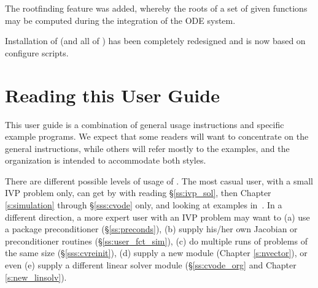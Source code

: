 The rootfinding feature was added, whereby the roots of a set of given
functions may be computed during the integration of the ODE system.

Installation of {\cvode} (and all of {\sundials}) has been completely 
redesigned and is now based on configure scripts.


\section{Reading this User Guide}\label{ss:reading}

This user guide is a combination of general usage instructions and
specific example programs.  We expect that some readers will want to
concentrate on the general instructions, while others will refer
mostly to the examples, and the organization is intended to
accommodate both styles.

There are different possible levels of usage of {\cvode}. The most
casual user, with a small IVP problem only, can get by with reading
\S\ref{ss:ivp_sol}, then Chapter \ref{s:simulation} through
\S\ref{sss:cvode} only, and looking at examples in~\cite{cvode_ex}.
In a different direction, a more expert user with an IVP problem may want
to (a) use a package preconditioner (\S\ref{ss:preconds}), (b) supply
his/her own Jacobian or preconditioner routines (\S\ref{ss:user_fct_sim}),
(c) do multiple runs of problems of the same size (\S\ref{sss:cvreinit}), 
(d) supply a new {\nvector} module (Chapter \ref{s:nvector}), or even 
(e) supply a different linear solver module
(\S\ref{ss:cvode_org} and Chapter \ref{s:new_linsolv}).

